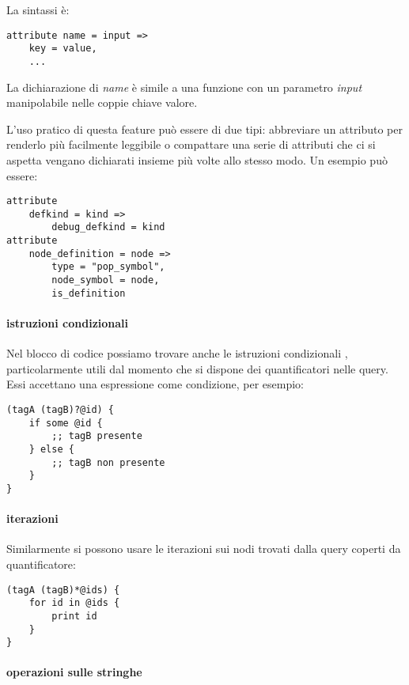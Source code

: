 La sintassi \`e:

\begin{lstlisting}
attribute name = input =>
    key = value,
    ...
\end{lstlisting}

La dichiarazione di \emph{name} \`e simile a una funzione con un parametro \emph{input} manipolabile nelle coppie chiave valore.

L'uso pratico di questa feature pu\`o essere di due tipi: abbreviare un attributo per renderlo pi\`u facilmente leggibile o compattare una serie di attributi che ci si aspetta vengano dichiarati insieme pi\`u volte allo stesso modo. Un esempio pu\`o essere:

\begin{lstlisting}
attribute
    defkind = kind =>
        debug_defkind = kind
attribute
    node_definition = node =>
        type = "pop_symbol",
        node_symbol = node,
        is_definition
\end{lstlisting}

\paragraph{istruzioni condizionali}

Nel blocco di codice possiamo trovare anche le istruzioni condizionali \cite{TreeSitterGraphReferenceConditionals}, particolarmente utili dal momento che si dispone dei quantificatori nelle query.
Essi accettano una espressione come condizione, per esempio:

\begin{lstlisting}
(tagA (tagB)?@id) {
    if some @id {
        ;; tagB presente
    } else {
        ;; tagB non presente
    }
}
\end{lstlisting}

\paragraph{iterazioni}

Similarmente si possono usare le iterazioni \cite{TreeSitterGraphReferenceListIterations} sui nodi trovati dalla query coperti da quantificatore:

\begin{lstlisting}
(tagA (tagB)*@ids) {
    for id in @ids {
        print id
    }
}
\end{lstlisting}

\paragraph{operazioni sulle stringhe}

